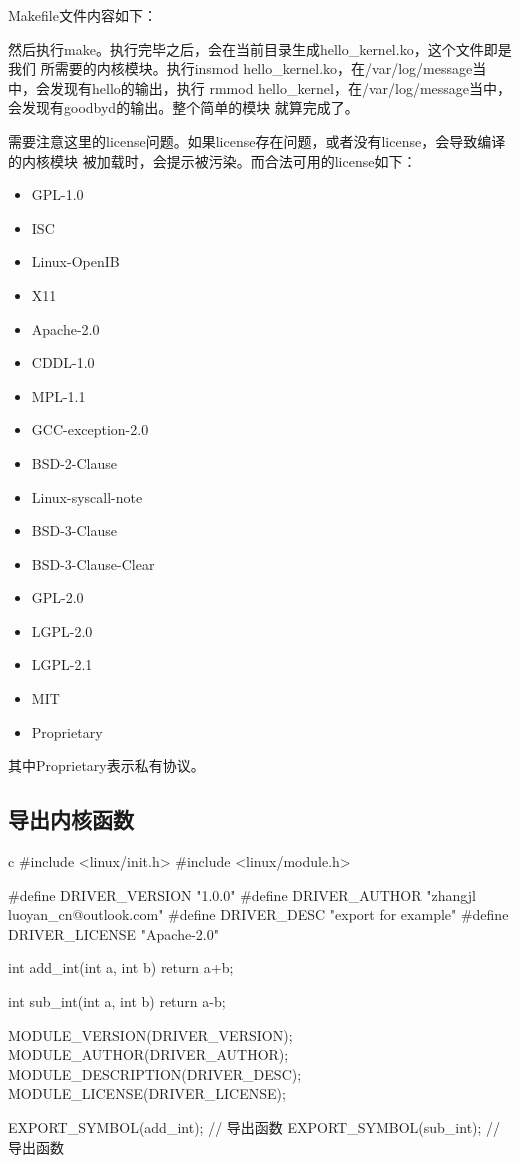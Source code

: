 Makefile文件内容如下：

然后执行make。执行完毕之后，会在当前目录生成hello\_kernel.ko，这个文件即是我们
所需要的内核模块。执行insmod hello\_kernel.ko，在/var/log/message当中，会发现有hello的输出，执行
rmmod hello\_kernel，在/var/log/message当中，会发现有goodbyd的输出。整个简单的模块
就算完成了。

需要注意这里的license问题。如果license存在问题，或者没有license，会导致编译的内核模块
被加载时，会提示被污染。而合法可用的license如下：
\begin{itemize}
  \item GPL-1.0
  \item ISC
  \item Linux-OpenIB
  \item X11
  \item Apache-2.0
  \item CDDL-1.0
  \item MPL-1.1
  \item GCC-exception-2.0
  \item BSD-2-Clause
  \item Linux-syscall-note
  \item BSD-3-Clause
  \item BSD-3-Clause-Clear
  \item GPL-2.0
  \item LGPL-2.0
  \item LGPL-2.1
  \item MIT
  \item Proprietary
\end{itemize}

其中Proprietary表示私有协议。

\subsection{导出内核函数}
\begin{code-block}{c}
#include <linux/init.h>
#include <linux/module.h>

#define DRIVER_VERSION  "1.0.0"
#define DRIVER_AUTHOR   "zhangjl luoyan_cn@outlook.com"
#define DRIVER_DESC     "export for example"
#define DRIVER_LICENSE  "Apache-2.0"

int add_int(int a, int b)
{
        return a+b;
}

int sub_int(int a, int b)
{
        return a-b;
}

MODULE_VERSION(DRIVER_VERSION);
MODULE_AUTHOR(DRIVER_AUTHOR);
MODULE_DESCRIPTION(DRIVER_DESC);
MODULE_LICENSE(DRIVER_LICENSE);

EXPORT_SYMBOL(add_int); // 导出函数
EXPORT_SYMBOL(sub_int); // 导出函数
\end{code-block}

